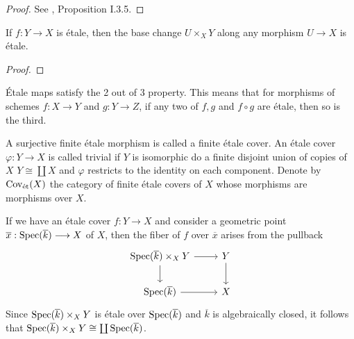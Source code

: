 \begin{proof}
	See \cite{milneEC}, Proposition I.3.5.
\end{proof}
\begin{lemma}
	If $f: Y \to X$ is \'etale, then the base change $U \times_X Y$ along any morphism $U \to X$ is \'etale.
\end{lemma}

\begin{proof}

\end{proof}

\begin{remark}
	\'Etale maps satisfy the 2 out of 3 property. This means that for morphisms of schemes $f \colon X \to Y$ and $g \colon Y \to Z$, if any two of $f, g$ and $f \circ g$ are \'etale, then so is the third.
\end{remark}

\begin{definition}
	A surjective finite \'etale morphism is called a finite \'etale cover. An \'etale cover $\varphi : Y \to X$ is called trivial if $Y$ is isomorphic do a finite disjoint union of copies of $X$ $Y \cong \coprod X$ and $\varphi$ restricts to the identity on each component. Denote by $\text{Cov}_{\text{\'et}}(X)$ the category of finite \'etale covers of $X$ whose morphisms are morphisms over $X$.
\end{definition}

\begin{remark}
	If we have an \'etale cover $f: Y \to X$ and consider a geometric point $\overline{x} : \operatorname{Spec}(\overline{k}) \longrightarrow X$ of $X$, then the fiber of $f$ over $\overline{x}$ arises from the pullback
	\[\begin{tikzcd}
			{\Spec(\overline{k})\times_X Y} & Y \\
			{\Spec(\overline{k})} & X
			\arrow[from=1-1, to=2-1]
			\arrow[from=1-1, to=1-2]
			\arrow[from=1-2, to=2-2]
			\arrow[from=2-1, to=2-2]
		\end{tikzcd}\]
	Since $\operatorname{Spec}(\overline{k})\times_X Y$ is \'etale over $\operatorname{Spec}(\overline{k})$ and $\overline{k}$ is algebraically closed, it follows that $\operatorname{Spec}(\overline{k})\times_X Y \cong \coprod \operatorname{Spec}(\overline{k})$.
\end{remark}

